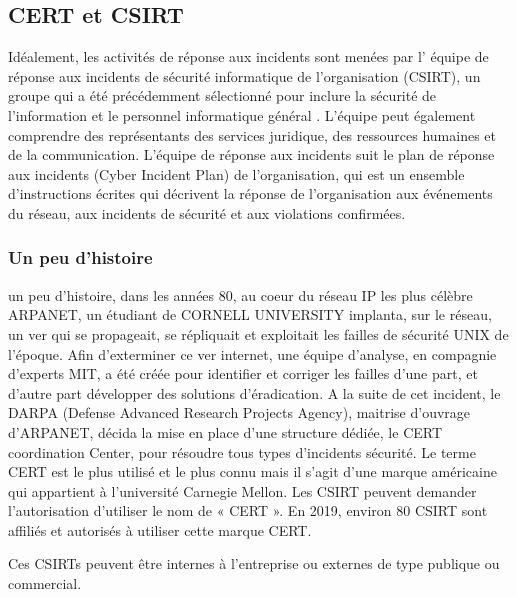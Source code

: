 %
%

\subsection{CERT et CSIRT}

Idéalement, les activités de réponse aux incidents sont menées par l' équipe de réponse aux incidents de sécurité informatique de l'organisation (CSIRT), un groupe qui a été précédemment sélectionné pour inclure la sécurité de l'information et le personnel informatique général . L'équipe peut également comprendre des représentants des services juridique, des ressources humaines et de la communication. L'équipe de réponse aux incidents suit le plan de réponse aux incidents (Cyber Incident Plan) de l'organisation, qui est un ensemble d'instructions écrites qui décrivent la réponse de l'organisation aux événements du réseau, aux incidents de sécurité et aux violations confirmées.

\subsubsection{Un peu d'histoire}
un peu d'histoire, dans les années 80, au coeur du réseau IP les plus célèbre ARPANET, un étudiant de CORNELL UNIVERSITY implanta, sur le réseau, un ver  qui se propageait, se répliquait et exploitait les failles de sécurité UNIX de l’époque. Afin d’exterminer ce ver internet, une équipe d’analyse, en compagnie d’experts MIT, a été créée pour identifier et corriger les failles d’une part, et d’autre part développer des solutions d’éradication. A la suite de cet incident, le DARPA (Defense Advanced Research Projects Agency), maitrise d’ouvrage d’ARPANET, décida la mise en place d’une structure dédiée, le CERT coordination Center, pour résoudre tous types d’incidents sécurité. Le terme CERT est le plus utilisé et le plus connu mais il s’agit d’une marque américaine qui appartient à l’université Carnegie Mellon. Les CSIRT peuvent demander l’autorisation d’utiliser le nom de « CERT ». En 2019, environ 80 CSIRT sont affiliés et autorisés à utiliser cette marque CERT.

Ces CSIRTs peuvent être internes à l'entreprise ou externes de type publique ou commercial.

